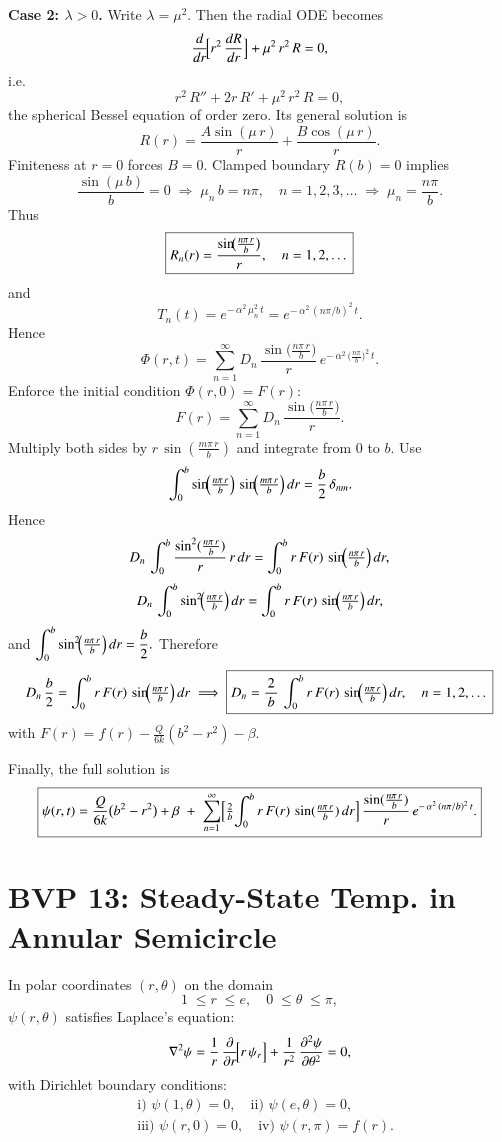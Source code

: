 \documentclass{report}
\begin{document}
\textbf{Case 2: \(\lambda > 0\).}  Write \(\lambda = \mu^{2}\).  Then the radial ODE becomes
\[
\frac{d}{dr}\!\Bigl[r^{2}\,\frac{dR}{dr}\Bigr] + \mu^{2}\,r^{2}\,R = 0,
\]
i.e.\ 
\[
r^{2}\,R'' + 2r\,R' + \mu^{2}\,r^{2}\,R = 0,
\]
the spherical Bessel equation of order zero.  Its general solution is
\[
R(r) 
= \frac{A\sin(\mu\,r)}{r} + \frac{B\cos(\mu\,r)}{r}.
\]
Finiteness at \(r=0\) forces \(B=0\).  Clamped boundary \(R(b) = 0\) implies
\[
\frac{\sin(\mu\,b)}{b} = 0 
\;\Longrightarrow\;
\mu_{n}\,b = n\pi,\quad n=1,2,3,\dots
\;\Longrightarrow\;
\mu_{n} = \frac{n\pi}{b}.
\]
Thus 
\[
\boxed{%
R_{n}(r) = \frac{\sin\!\bigl(\tfrac{n\pi\,r}{b}\bigr)}{r}, 
\quad n = 1,2,\dots
}
\]
and
\[
T_{n}(t) = e^{-\,\alpha^{2}\,\mu_{n}^{2}\,t} = e^{-\,\alpha^{2}\,(n\pi/b)^{2}\,t}.
\]
Hence 
\[
\Phi(r,t) 
= \sum_{n=1}^{\infty} D_{n}\,\frac{\sin\!\bigl(\tfrac{n\pi\,r}{b}\bigr)}{r}\,
e^{-\,\alpha^{2}\,\bigl(\tfrac{n\pi}{b}\bigr)^{2}\,t}.
\]
Enforce the initial condition \(\Phi(r,0) = F(r)\):
\[
F(r) = \sum_{n=1}^{\infty} D_{n}\,\frac{\sin\!\bigl(\tfrac{n\pi\,r}{b}\bigr)}{r}.
\]
Multiply both sides by \(r\,\sin(\tfrac{m\pi\,r}{b})\) and integrate from \(0\) to \(b\).  Use
\[
\int_{0}^{b} \sin\!\Bigl(\tfrac{n\pi\,r}{b}\Bigr)\,\sin\!\Bigl(\tfrac{m\pi\,r}{b}\Bigr)\,dr
= 
\frac{b}{2}\,\delta_{nm}.
\]
Hence
\[
D_{n}\,\int_{0}^{b} \frac{\sin^{2}(\tfrac{n\pi\,r}{b})}{r}\,r\,dr
= 
\int_{0}^{b} r\,F(r)\,\sin\!\Bigl(\tfrac{n\pi\,r}{b}\Bigr)\,dr,
\]
\[
D_{n}\,\int_{0}^{b} \sin^{2}\!\Bigl(\tfrac{n\pi\,r}{b}\Bigr)\,dr
= 
\int_{0}^{b} r\,F(r)\,\sin\!\Bigl(\tfrac{n\pi\,r}{b}\Bigr)\,dr,
\]
and 
\(\displaystyle \int_{0}^{b} \sin^{2}\!\Bigl(\tfrac{n\pi\,r}{b}\Bigr)\,dr = \frac{b}{2}.\)
Therefore
\[
D_{n}\,\frac{b}{2} 
= 
\int_{0}^{b} r\,F(r)\,\sin\!\Bigl(\tfrac{n\pi\,r}{b}\Bigr)\,dr
\;\Longrightarrow\;
\boxed{%
D_{n}
= \frac{2}{\,b\,}\,
\int_{0}^{b} r\,F(r)\,\sin\!\Bigl(\tfrac{n\pi\,r}{b}\Bigr)\,dr,
\quad n=1,2,\dots
}
\]
with \(F(r) = f(r) - \tfrac{Q}{6k}(b^{2}-r^{2}) - \beta.\)

Finally, the full solution is
\[
\boxed{%
\psi(r,t) 
= \frac{Q}{6k}\bigl(b^{2} - r^{2}\bigr) + \beta
\;+\;\sum_{n=1}^{\infty} 
\Bigl[\tfrac{2}{b}\!\int_{0}^{b} r\,F(r)\,\sin(\tfrac{n\pi\,r}{b})\,dr\Bigr]\,
\frac{\sin(\tfrac{n\pi\,r}{b})}{r}\,
e^{-\,\alpha^{2}\,(n\pi/b)^{2}\,t}.
}
\]

\section{BVP 13: Steady-State Temp. in Annular Semicircle}

In polar coordinates \((r,\theta)\) on the domain 
\[
1 \;\le r \;\le e,\quad 0 \;\le \theta \;\le \pi,
\]
\(\psi(r,\theta)\) satisfies Laplace’s equation:
\[
\nabla^{2}\psi 
= \frac{1}{r}\,\frac{\partial}{\partial r}\!\Bigl[r\,\psi_{r}\Bigr]
+ \frac{1}{r^{2}}\,\frac{\partial^{2}\psi}{\partial \theta^{2}} 
= 0,
\]
with Dirichlet boundary conditions:
\[
\begin{aligned}
&\text{i) } \psi(1,\theta) = 0, 
\quad
\text{ii) } \psi(e,\theta) = 0,\\
&\text{iii) } \psi(r,0) = 0, 
\quad
\text{iv) } \psi(r,\pi) = f(r).
\end{aligned}
\]
\end{document}
